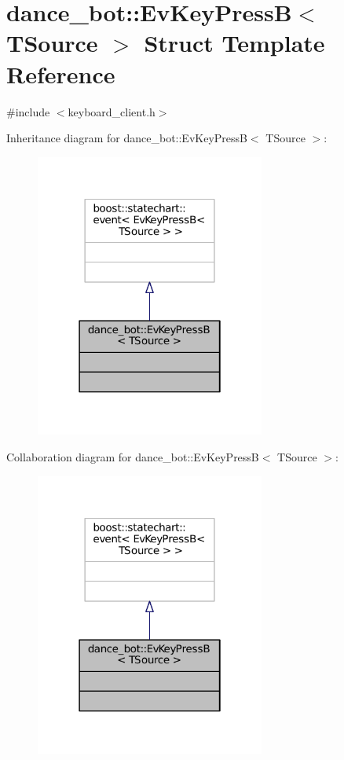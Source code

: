 \hypertarget{structdance__bot_1_1EvKeyPressB}{}\section{dance\+\_\+bot\+:\+:Ev\+Key\+PressB$<$ T\+Source $>$ Struct Template Reference}
\label{structdance__bot_1_1EvKeyPressB}


{\ttfamily \#include $<$keyboard\+\_\+client.\+h$>$}



Inheritance diagram for dance\+\_\+bot\+:\+:Ev\+Key\+PressB$<$ T\+Source $>$\+:
\nopagebreak
\begin{figure}[H]
\begin{center}
\leavevmode
\includegraphics[width=214pt]{structdance__bot_1_1EvKeyPressB__inherit__graph}
\end{center}
\end{figure}


Collaboration diagram for dance\+\_\+bot\+:\+:Ev\+Key\+PressB$<$ T\+Source $>$\+:
\nopagebreak
\begin{figure}[H]
\begin{center}
\leavevmode
\includegraphics[width=214pt]{structdance__bot_1_1EvKeyPressB__coll__graph}
\end{center}
\end{figure}


